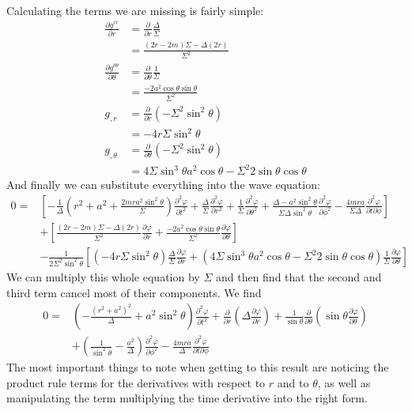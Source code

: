 \documentclass[11pt]{article}
\numberwithin{equation}{section}
\numberwithin{figure}{section}
\numberwithin{table}{section}
\begin{document}
Calculating the terms we are missing is fairly simple:
\begin{align*}
    \frac{\partial g^{rr}}{\partial r}&=\frac{\partial}{\partial r}\frac{\Delta}{\Sigma}\\
    &=\frac{(2r-2m)\Sigma-\Delta(2r)}{\Sigma^2}\\
    \frac{\partial g^{\theta\theta}}{\partial \theta}&=\frac{\partial}{\partial \theta}\frac{1}{\Sigma}\\
    &=\frac{-2a^2\cos\theta\sin\theta}{\Sigma^2}\\
    g_{,r}&=\frac{\partial}{\partial r}(-\Sigma^2\sin^2\theta)\\
    &=-4r\Sigma\sin^2\theta\\
    g_{,\theta}&=\frac{\partial}{\partial \theta}(-\Sigma^2\sin^2\theta)\\
    &=4\Sigma\sin^3\theta a^2\cos\theta-\Sigma^2 2\sin\theta\cos\theta
\end{align*}
And finally we can substitute everything into the wave equation:
\begin{align*}
    0=&\left[-\frac{1}{\Delta}\left(r^2+a^2+\frac{2mra^2\sin^2\theta}{\Sigma}\right)\frac{\partial^2\varphi}{\partial t^2}+\frac{\Delta}{\Sigma}\frac{\partial^2\varphi}{\partial r^2}+\frac{1}{\Sigma}\frac{\partial^2\varphi}{\partial\theta^2}+\frac{\Delta-a^2\sin^2\theta}{\Sigma\Delta\sin^2\theta}\frac{\partial^2\varphi}{\partial\phi^2}-\frac{4mra}{\Sigma\Delta}\frac{\partial^2\varphi}{\partial t\partial\phi}\right]\\
    &+\left[\frac{(2r-2m)\Sigma-\Delta(2r)}{\Sigma^2}\frac{\partial\varphi}{\partial r}+\frac{-2a^2\cos\theta\sin\theta}{\Sigma^2}\frac{\partial \varphi}{\partial \theta}\right]\\&-\frac{1}{2\Sigma^2\sin^2\theta}\left[(-4r\Sigma\sin^2\theta)\frac{\Delta}{\Sigma}\frac{\partial\varphi}{\partial r}+(4\Sigma\sin^3\theta a^2\cos\theta-\Sigma^2 2\sin\theta\cos\theta)\frac{1}{\Sigma}\frac{\partial\varphi}{\partial\theta}\right]
\end{align*}
We can multiply this whole equation by $\Sigma$ and then find that the second and third term cancel most of their components. We find
\begin{equation}
    \begin{aligned}
        0=&\left(-\frac{(r^2+a^2)^2}{\Delta}+a^2\sin^2\theta\right)\frac{\partial^2\varphi}{\partial t^2}+\frac{\partial}{\partial r}\left(\Delta\frac{\partial\varphi}{\partial r}\right)+\frac{1}{\sin\theta}\frac{\partial}{\partial\theta}\left(\sin\theta\frac{\partial\varphi}{\partial\theta}\right)\\&+\left(\frac{1}{\sin^2\theta}-\frac{a^2}{\Delta}\right)\frac{\partial^2\varphi}{\partial\phi^2}-\frac{4mra}{\Delta}\frac{\partial^2\varphi}{\partial t\partial\phi}
    \end{aligned}
    \label{eqn:wave equation kerr metric}
\end{equation}
The most important things to note when getting to this result are noticing the product rule terms for the derivatives with respect to $r$ and to $\theta$, as well as manipulating the term multiplying the time derivative into the right form. 
\end{document}
